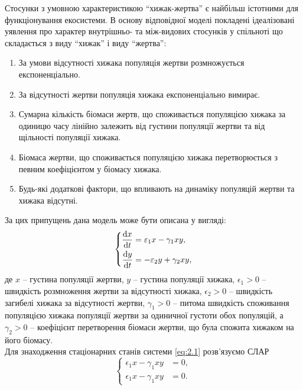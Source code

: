 Стосунки з умовною характеристикою ``хижак-жертва'' є найбільш істотними для функціонування екосистеми. В основу відповідної моделі покладені ідеалізовані уявлення про характер внутрішньо- та між-видових стосунків у спільноті що складається з виду ``хижак'' і виду ``жертва'':
\begin{enumerate}
    \item За умови відсутності хижака популяція жертви розмножується експоненціально.
    \item За відсутності жертви популяція хижака експоненціально вимирає.
    \item Сумарна кількість біомаси жертв, що споживається популяцією хижака за одиницю часу лінійно залежить від густини популяції жертви та від щільності популяції хижака.
    \item Біомаса жертви, що споживається популяцією хижака перетворюється з певним коефіцієнтом у біомасу хижака.
    \item Будь-які додаткові фактори, що впливають на динаміку популяцій жертви та хижака відсутні.
\end{enumerate}

За цих припущень дана модель може бути описана у вигляді:
\begin{equation}
    \label{eq:2.1}
    \left\{
\begin{aligned}
    \frac{\mathop{}\!\mathrm{d} x}{\mathop{}\!\mathrm{d} t} &= \varepsilon_1 x - \gamma_1 x y, \\
    \frac{\mathop{}\!\mathrm{d} y}{\mathop{}\!\mathrm{d} t} &= - \varepsilon_2 y + \gamma_2 x y, 
\end{aligned}
\right.
\end{equation}
де $x$ -- густина популяції жертви, $y$ -- густина популяції хижака, $\epsilon_1 > 0$ -- швидкість розмноження жертви за відсутності хижака, $\epsilon_2 > 0$ -- швидкість загибелі хижака за відсутності жертви, $\gamma_1 > 0$ -- питома швидкість споживання популяцією хижака популяції жертви за одиничної густоти обох популяцій, а $\gamma_2 > 0$ -- коефіцієнт перетворення біомаси жертви, що була спожита хижаком на його біомасу. \\

Для знаходження стаціонарних станів системи \eqref{eq:2.1} розв'язуємо СЛАР
\begin{equation}
    \left\{
    \begin{aligned}
    \epsilon_1 x - \gamma_1 x y &= 0, \\
    \epsilon_1 x - \gamma_1 x y &= 0.
\end{aligned}
\right.
\end{equation}

